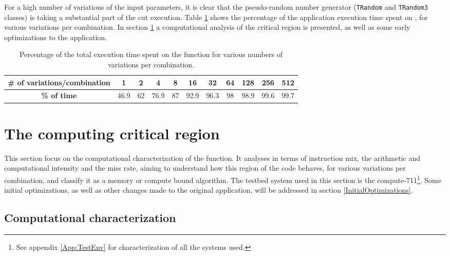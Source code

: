 For a high number of variations of the input parameters, it is clear that the pseudo-random number generator (\texttt{TRandom} and \texttt{TRandom3} classes) is taking a substantial part of the cut execution. Table \ref{tab:TempoKinFit} shows the percentage of the application execution time spent on \ttDilepKinFit, for various variations per combination. In section \ref{CriticalRegion} a computational analysis of the critical region is presented, as well as some early optimizations to the application.

\begin{table}[!htp]
	\begin{center}
		\begin{tabular}{|c|c|c|c|c|c|c|c|c|c|c|}
			\hline
			\textbf{# of variations/combination} & 1 & 2 & 4 & 8 & 16 & 32 & 64 & 128 & 256 & 512 \\ \hline
			\textbf{\% of time} & 46.9 & 62 & 76.9 & 87 & 92.9 & 96.3 & 98 & 98.9 & 99.6 & 99.7 \\ \hline
		\end{tabular}
		\caption{Percentage of the total execution time spent on the \ttDilepKinFit function for various numbers of variations per combination.}
		\label{tab:TempoKinFit}
	\end{center}
\end{table}

\section{The computing critical region}
\label{CriticalRegion}

This section focus on the computational characterization of the \ttDilepKinFit function. It analyses in terms of instruction mix, the arithmetic and computational intensity and the miss rate, aiming to understand how this region of the code behaves, for various variations per combination, and classify it as a memory or compute bound algorithm. The testbed system used in this section is the compute-711\footnote{See appendix \ref{App:TestEnv} for characterization of all the systems used.}. Some initial optimizations, as well as other changes made to the original application, will be addressed in section \ref{InitialOptimizations}.

\subsection{Computational characterization}
\label{ComputationalCharactrization}

